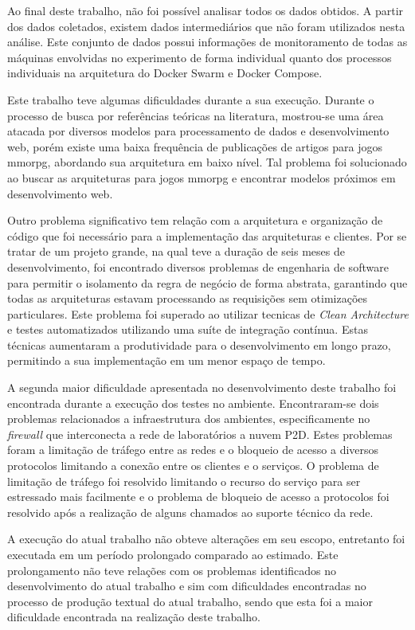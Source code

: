 Ao final deste trabalho, não foi possível analisar todos os dados obtidos.
%
A partir dos dados coletados, existem dados intermediários que não foram utilizados nesta análise.
%
Este conjunto de dados possui informações de monitoramento de todas as máquinas envolvidas no experimento de forma individual quanto dos processos individuais na arquitetura do Docker Swarm e Docker Compose.

Este trabalho teve algumas dificuldades durante a sua execução.
%
Durante o processo de busca por referências teóricas na literatura, mostrou-se uma área atacada por diversos modelos para processamento de dados e desenvolvimento web, porém existe uma baixa frequência de publicações de artigos para jogos \ac{mmorpg}, abordando sua arquitetura em baixo nível.
%
Tal problema foi solucionado ao buscar as arquiteturas para jogos \ac{mmorpg} e encontrar modelos próximos em desenvolvimento web.

Outro problema significativo tem relação com a arquitetura e organização de código que foi necessário para a implementação das arquiteturas e clientes.
%
Por se tratar de um projeto grande, na qual teve a duração de seis meses de desenvolvimento, foi encontrado diversos problemas de engenharia de software para permitir o isolamento da regra de negócio de forma abstrata, garantindo que todas as arquiteturas estavam processando as requisições sem otimizações particulares.
%
Este problema foi superado ao utilizar tecnicas de \textit{Clean Architecture} e testes automatizados utilizando uma suíte de integração contínua.
%
Estas técnicas aumentaram a produtividade para o desenvolvimento em longo prazo, permitindo a sua implementação em um menor espaço de tempo.
%

A segunda maior dificuldade apresentada no desenvolvimento deste trabalho foi encontrada durante a execução dos testes no ambiente.
%
Encontraram-se dois problemas relacionados a infraestrutura dos ambientes, especificamente no \textit{firewall} que interconecta a rede de laboratórios a nuvem P2D.
%
Estes problemas foram a limitação de tráfego entre as redes e o bloqueio de acesso a diversos protocolos limitando a conexão entre os clientes e o serviços.
%
O problema de limitação de tráfego foi resolvido limitando o recurso do serviço para ser estressado mais facilmente e o problema de bloqueio de acesso a protocolos foi resolvido após a realização de alguns chamados ao suporte técnico da rede.
%

A execução do atual trabalho não obteve alterações em seu escopo, entretanto foi executada em um período prolongado comparado ao estimado.
%
Este prolongamento não teve relações com os problemas identificados no desenvolvimento do atual trabalho e sim com dificuldades encontradas no processo de produção textual do atual trabalho, sendo que esta foi a maior dificuldade encontrada na realização deste trabalho.

